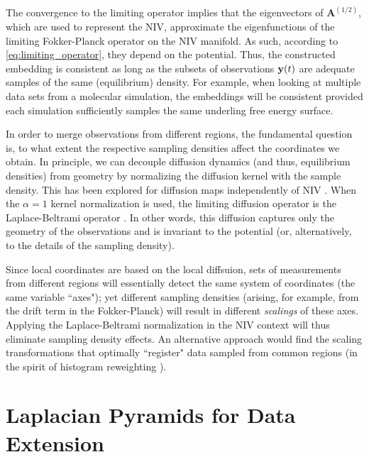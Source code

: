 The convergence to the limiting operator implies that the eigenvectors of $\mathbf{A}^{(1/2)}$, which are used to represent the NIV, approximate the eigenfunctions of the limiting Fokker-Planck operator on the NIV manifold.
%
As such, according to \eqref{eq:limiting_operator}, they depend on the potential.
%
Thus, the constructed embedding is consistent as long as the subsets of observations $\mathbf{y}(t)$ are
adequate samples of the same (equilibrium) density.
%
For example, when looking at multiple data sets from a molecular simulation, the embeddings will be consistent provided each simulation sufficiently samples the same underling free energy surface.

In order to merge observations from different regions,
the fundamental question is, to what extent the respective sampling densities affect the coordinates we obtain.
%
In principle, we can decouple diffusion dynamics (and thus, equilibrium densities)
from geometry by normalizing the diffusion kernel with the sample density.
%
This has been explored for diffusion maps independently of NIV \cite{coifman2005geometric}.
%
When the $\alpha=1$ kernel normalization is used,
the limiting diffusion operator is the Laplace-Beltrami operator \cite{nadler2006diffusion}.
%
In other words, this diffusion captures only the geometry of the observations and is invariant to the potential (or, alternatively,
to the details of the sampling density).

Since local coordinates are based on the local diffsuion, sets of measurements from different regions
will essentially detect the same system of coordinates (the same variable ``axes");
yet different sampling densities (arising, for example,
from the drift term in the Fokker-Planck) will result in different {\em scalings} of these axes.
%
Applying the Laplace-Beltrami normalization in the NIV context will thus eliminate sampling density effects.
%
An alternative approach would find the scaling transformations that optimally ``register"
data sampled from common regions (in the spirit of histogram reweighting \cite{ferrenberg1988new}).


\section{Laplacian Pyramids for Data Extension} \label{sec:LapPyr}

